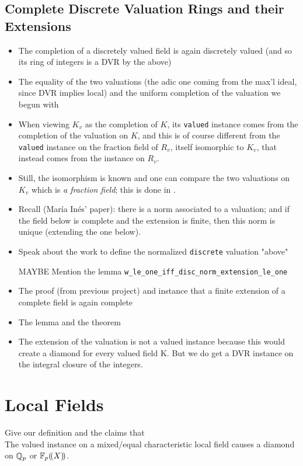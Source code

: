 \documentclass[sigplan,10pt,anonymous,review]{acmart}\settopmatter{printfolios=true,printccs=false,printacmref=false}
\begin{document}
\subsection{Complete Discrete Valuation Rings and their Extensions}
\begin{itemize}
\item The completion of a discretely valued field is again discretely valued (and so its ring of integers is a DVR by the above)
\item The equality of the two valuations (the adic one coming from the max'l ideal, since DVR implies local) and the uniform completion of the valuation we begun with
\item When viewing $K_v$ as the completion of $K$, its \texttt{valued} instance comes from the completion of the valuation on $K$, and this is of course different from the \texttt{valued} instance on the fraction field of $R_v$, itself isomorphic to $K_v$, that instead comes from the  instance on $R_v$.
\item Still, the isomorphism is known and one can compare the two valuations on $K_v$ which is \emph{a fraction field}; this is done in .
\item Recall (María Inés' paper): there is a norm associated to a valuation; and if the field below is complete and the extension is finite, then this norm is unique (extending the one below).
\item Speak about the work to define the normalized \texttt{discrete} valuation "above"
\item [MAYBE] Mention the lemma \texttt{w\_le\_one\_iff\_disc\_norm\_extension\_le\_one}
\item The proof (from previous project) and instance that a finite extension of a complete field is again complete
\item The lemma  and the theorem 
\item The extension of the valuation is not a valued instance because this would create a diamond for every valued field K. But we do get a DVR instance on the integral closure of the integers.
\end{itemize}
\section{Local Fields}
Give our definition and the claims that \\
The valued instance on a mixed/equal characteristic local field causes a diamond on $\mathbb{Q}_p$ or
${\mathbb{F}_{p}}(\!(X)\!)$.
\end{document}
